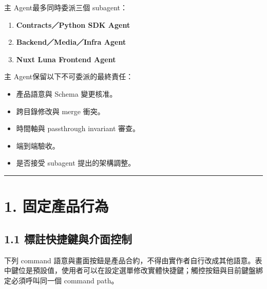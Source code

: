 \documentclass[
  9pt,
  a4paper,
]{article}
\providecommand{\tightlist}{%
  \setlength{\itemsep}{0pt}\setlength{\parskip}{0pt}}
\begin{document}
主 Agent最多同時委派三個 subagent：

\begin{enumerate}
\def\labelenumi{\arabic{enumi}.}
\tightlist
\item
  \textbf{Contracts／Python SDK Agent}
\item
  \textbf{Backend／Media／Infra Agent}
\item
  \textbf{Nuxt Luna Frontend Agent}
\end{enumerate}

主 Agent保留以下不可委派的最終責任：

\begin{itemize}
\tightlist
\item
  產品語意與 Schema 變更核准。
\item
  跨目錄修改與 merge 衝突。
\item
  時間軸與 passthrough invariant 審查。
\item
  端到端驗收。
\item
  是否接受 subagent 提出的架構調整。
\end{itemize}

\begin{center}\rule{0.5\linewidth}{0.5pt}\end{center}

\section{1. 固定產品行為}\label{1-ux56faux5b9aux7522ux54c1ux884cux70ba}

\subsection{1.1
標註快捷鍵與介面控制}\label{11-ux6a19ux8a3bux5febux6377ux9375ux8207ux4ecbux9762ux63a7ux5236}

下列 command 語意與畫面按鈕是產品合約，不得由實作者自行改成其他語意。表中鍵位是預設值，使用者可以在設定選單修改實體快捷鍵；觸控按鈕與目前鍵盤綁定必須呼叫同一個 command path。
\end{document}

